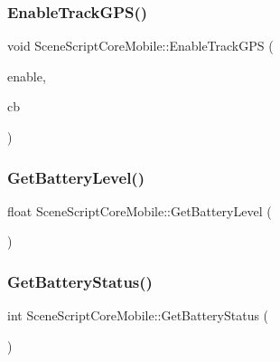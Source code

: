 \hypertarget{class_scene_script_core_mobile_a099ef38d65b95396210b8e62089f2a91}{}\label{class_scene_script_core_mobile_a099ef38d65b95396210b8e62089f2a91} 
\subsubsection{\texorpdfstring{Enable\+Track\+G\+P\+S()}{EnableTrackGPS()}}
{\footnotesize\ttfamily void Scene\+Script\+Core\+Mobile\+::\+Enable\+Track\+G\+PS (\begin{DoxyParamCaption}\item[{bool}]{enable,  }\item[{Callback1\+I2F@}]{cb }\end{DoxyParamCaption})}

\hypertarget{class_scene_script_core_mobile_ae5998ea117850e790822c3446834e15f}{}\label{class_scene_script_core_mobile_ae5998ea117850e790822c3446834e15f} 
\subsubsection{\texorpdfstring{Get\+Battery\+Level()}{GetBatteryLevel()}}
{\footnotesize\ttfamily float Scene\+Script\+Core\+Mobile\+::\+Get\+Battery\+Level (\begin{DoxyParamCaption}{ }\end{DoxyParamCaption})}

\hypertarget{class_scene_script_core_mobile_a34e0107e67f704de98e425673e189a5c}{}\label{class_scene_script_core_mobile_a34e0107e67f704de98e425673e189a5c} 
\subsubsection{\texorpdfstring{Get\+Battery\+Status()}{GetBatteryStatus()}}
{\footnotesize\ttfamily int Scene\+Script\+Core\+Mobile\+::\+Get\+Battery\+Status (\begin{DoxyParamCaption}{ }\end{DoxyParamCaption})}

